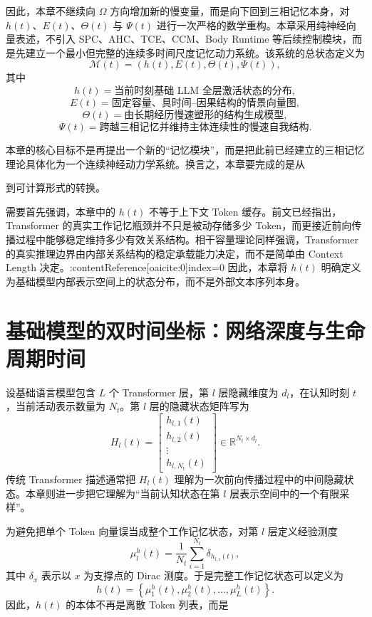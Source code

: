 因此，本章不继续向 $\Omega$ 方向增加新的慢变量，而是向下回到三相记忆本身，对 $h(t)$、$E(t)$、$\Theta(t)$ 与 $\Psi(t)$ 进行一次严格的数学重构。本章采用纯神经向量表述，不引入 SPC、AHC、TCE、CCM、Body Runtime 等后续控制模块，而是先建立一个最小但完整的连续多时间尺度记忆动力系统。该系统的总状态定义为
\[
\mathcal{M}(t)
=
\left(
h(t),E(t),\Theta(t),\Psi(t)
\right),
\]
其中
\[
h(t)
=
\text{当前时刻基础 LLM 全层激活状态的分布},
\]
\[
E(t)
=
\text{固定容量、具时间--因果结构的情景向量图},
\]
\[
\Theta(t)
=
\text{由长期经历慢速塑形的结构生成模型},
\]
\[
\Psi(t)
=
\text{跨越三相记忆并维持主体连续性的慢速自我结构}.
\]

本章的核心目标不是再提出一个新的“记忆模块”，而是把此前已经建立的三相记忆理论具体化为一个连续神经动力学系统。换言之，本章要完成的是从
\begin{statementbox}
\centering
{}
\end{statementbox}
到可计算形式的转换。

需要首先强调，本章中的 $h(t)$ 不等于上下文 Token 缓存。前文已经指出，Transformer 的真实工作记忆瓶颈并不只是被动存储多少 Token，而更接近前向传播过程中能够稳定维持多少有效关系结构。相干容量理论同样强调，Transformer 的真实推理边界由内部关系结构的稳定承载能力决定，而不是简单由 Context Length 决定。:contentReference[oaicite:0]{index=0} 因此，本章将 $h(t)$ 明确定义为基础模型内部表示空间上的状态分布，而不是外部文本序列本身。

\section{基础模型的双时间坐标：网络深度与生命周期时间}

设基础语言模型包含 $L$ 个 Transformer 层，第 $l$ 层隐藏维度为 $d_l$，在认知时刻 $t$，当前活动表示数量为 $N_t$。第 $l$ 层的隐藏状态矩阵写为
\[
H_l(t)
=
\begin{bmatrix}
h_{l,1}(t)\\
h_{l,2}(t)\\
\vdots\\
h_{l,N_t}(t)
\end{bmatrix}
\in
\mathbb{R}^{N_t\times d_l}.
\]
传统 Transformer 描述通常把 $H_l(t)$ 理解为一次前向传播过程中的中间隐藏状态。本章则进一步把它理解为“当前认知状态在第 $l$ 层表示空间中的一个有限采样”。

为避免把单个 Token 向量误当成整个工作记忆状态，对第 $l$ 层定义经验测度
\[
\mu_l^h(t)
=
\frac{1}{N_t}
\sum_{i=1}^{N_t}
\delta_{h_{l,i}(t)},
\]
其中 $\delta_x$ 表示以 $x$ 为支撑点的 Dirac 测度。于是完整工作记忆状态可以定义为
\[
h(t)
=
\left\{
\mu_1^h(t),
\mu_2^h(t),
\ldots,
\mu_L^h(t)
\right\}.
\]
因此，$h(t)$ 的本体不再是离散 Token 列表，而是
\begin{statementbox}
\centering
{}
\end{statementbox}

